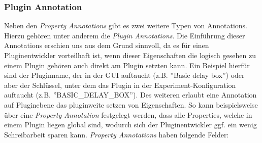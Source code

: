 \documentclass[a4paper, 11pt]{article} %
\begin{document}
\subsubsection{Plugin Annotation} %
\label{ssub:plugin_annotation}
Neben den \emph{Property Annotations} gibt es zwei weitere Typen von Annotations. Hierzu gehören unter anderem die \emph{Plugin Annotations}. Die Einführung dieser Annotations erschien uns aus dem Grund sinnvoll, da es für einen Pluginentwickler vorteilhaft ist, wenn dieser Eigenschaften die logisch gesehen zu einem Plugin gehören auch direkt am Plugin setzten kann. Ein Beispiel hierfür sind der Pluginname, der in der GUI auftaucht (z.B. ''Basic delay box'') oder aber der Schlüssel, unter dem das Plugin in der Experiment-Konfiguration auftaucht (z.B. ''BASIC\_DELAY\_BOX''). Des weiteren erlaubt eine Annotation auf Pluginebene das pluginweite setzen von Eigenschaften. So kann beispielsweise über eine \emph{Property Annotation} festgelegt werden, dass alle Properties, welche in einem Plugin liegen global sind, wodurch sich der Pluginentwickler ggf. ein wenig Schreibarbeit sparen kann. \emph{Property Annotations} haben folgende Felder:
\end{document}
